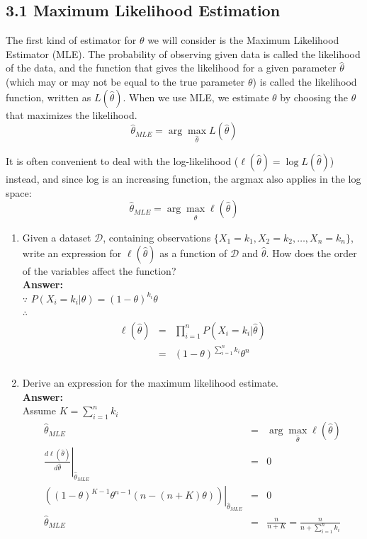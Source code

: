 \documentclass{article}
\begin{document}
\subsection*{3.1 Maximum Likelihood Estimation}

The first kind of estimator for $\theta$ we will consider is the Maximum Likelihood Estimator (MLE). The probability of observing given data is called the likelihood of the data, and the function that gives the likelihood for a given parameter $\hat{\theta}$ (which may or may not be equal to the true parameter $\theta$) is called the likelihood function, written as $L(\hat{\theta})$. When we use MLE, we estimate $\theta$ by choosing the $\hat{\theta}$ that maximizes the likelihood.
$$\hat{\theta}_{MLE}=\arg\max_{\hat{\theta}}L(\hat{\theta})$$

It is often convenient to deal with the log-likelihood ($\ell(\hat{\theta})=\log L(\hat{\theta})$) instead, and since log is an increasing function, the argmax also applies in the log space:
$$\hat{\theta}_{MLE}=\arg\max_{\hat{\theta}}\ell(\hat{\theta})$$

\begin{enumerate}
	\item Given a dataset $\mathcal{D}$, containing observations $\{X_1=k_1,X_2=k_2,\dots,X_n=k_n\}$, write an expression for $\ell(\hat{\theta})$ as a function of $\mathcal{D}$ and $\hat{\theta}$. How does the order of the variables affect the function?
	\\\textbf{Answer:}\\
	$\because$ $P(X_i=k_i|\theta)=(1-\theta)^{k_i}\theta$\\
	$\therefore$
	\begin{equation}
	\nonumber
	\begin{array}{rcl}
	\ell(\hat{\theta}) & = & \prod_{i=1}^{n}P(X_i=k_i|\hat{\theta}) \\
					   & = & (1-\theta)^{\sum_{i=1}^{n}{k_i}}\theta^n \\
	\end{array}
	\end{equation}
	
	\item Derive an expression for the maximum likelihood estimate.
	\\\textbf{Answer:}\\
	Assume $K=\sum_{i=1}^{n}{k_i}$
	\begin{equation}
	\nonumber
	\begin{array}{rcl}
	\hat{\theta}_{MLE} & = & \arg\max_{\hat{\theta}}\ell(\hat{\theta}) \\
	\left. \frac{d\ell(\hat{\theta})}{d\hat{\theta}}\right|_{\hat{\theta}_{MLE}}	& = & 0 \\
	\left. ((1-\theta)^{K-1}\theta^{n-1}(n-(n+K)\theta))\right|_{\hat{\theta}_{MLE}} & = & 0 \\
	\hat{\theta}_{MLE} & = & \frac{n}{n+K} = \frac{n}{n+\sum_{i=1}^{n}{k_i}} \\
	\end{array}
	\end{equation}
\end{enumerate}
\end{document}
